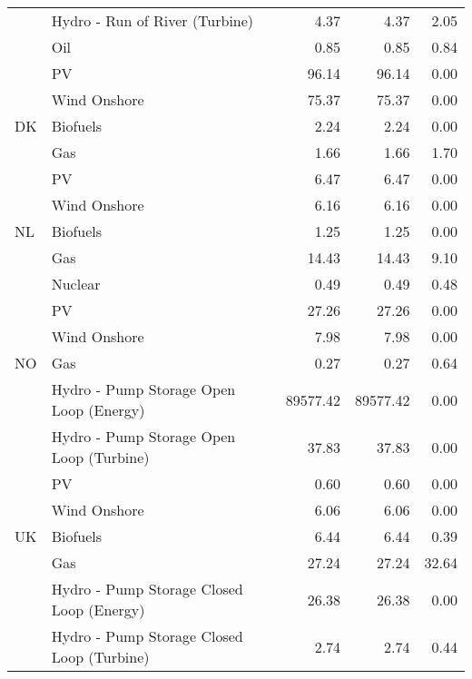\begin{table}
\begin{tabular}{llrrr}
   & Hydro - Run of River (Turbine) &               4.37 &              4.37 &            2.05 \\
   & Oil &               0.85 &              0.85 &            0.84 \\
   & PV &              96.14 &             96.14 &            0.00 \\
   & Wind Onshore &              75.37 &             75.37 &            0.00 \\
DK & Biofuels &               2.24 &              2.24 &            0.00 \\
   & Gas &               1.66 &              1.66 &            1.70 \\
   & PV &               6.47 &              6.47 &            0.00 \\
   & Wind Onshore &               6.16 &              6.16 &            0.00 \\
NL & Biofuels &               1.25 &              1.25 &            0.00 \\
   & Gas &              14.43 &             14.43 &            9.10 \\
   & Nuclear &               0.49 &              0.49 &            0.48 \\
   & PV &              27.26 &             27.26 &            0.00 \\
   & Wind Onshore &               7.98 &              7.98 &            0.00 \\
NO & Gas &               0.27 &              0.27 &            0.64 \\
   & Hydro - Pump Storage Open Loop (Energy) &           89577.42 &          89577.42 &            0.00 \\
   & Hydro - Pump Storage Open Loop (Turbine) &              37.83 &             37.83 &            0.00 \\
   & PV &               0.60 &              0.60 &            0.00 \\
   & Wind Onshore &               6.06 &              6.06 &            0.00 \\
UK & Biofuels &               6.44 &              6.44 &            0.39 \\
   & Gas &              27.24 &             27.24 &           32.64 \\
   & Hydro - Pump Storage Closed Loop (Energy) &              26.38 &             26.38 &            0.00 \\
   & Hydro - Pump Storage Closed Loop (Turbine) &               2.74 &              2.74 &            0.44 \\

\end{tabular}
\end{table}
